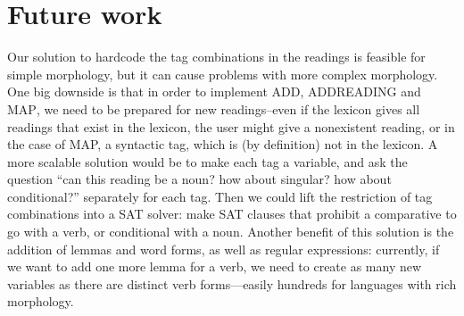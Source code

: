 



\section{Future work}


Our solution to hardcode the tag combinations in the readings is feasible for simple morphology, but it can cause problems with more complex morphology. One big downside is that in order to implement \textsc{ADD}, \textsc{ADDREADING} and \textsc{MAP}, we need to be prepared for new readings--even if the lexicon gives all readings that exist in the lexicon, the user might give a nonexistent reading, or in the case of MAP, a syntactic tag, which is (by definition) not in the lexicon. A more scalable solution would be to make each tag a variable, and ask the question ``can this reading be a noun? how about singular? how about conditional?'' separately for each tag. Then we could lift the restriction of tag combinations into a SAT solver: make SAT clauses that prohibit a comparative to go with a verb, or conditional with a noun.
Another benefit of this solution is the addition of lemmas and word forms, as well as regular expressions: currently, if we want to add one more lemma for a verb, we need to create as many new variables as there are distinct verb forms---easily hundreds for languages with rich morphology.


